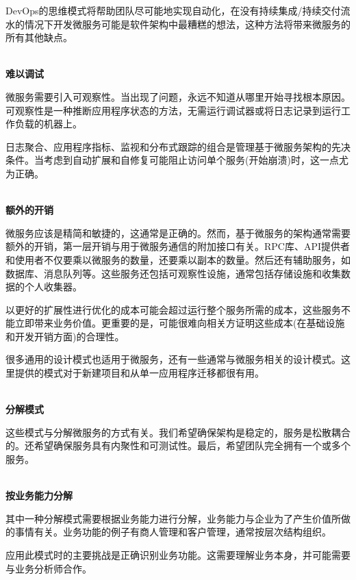 DevOps的思维模式将帮助团队尽可能地实现自动化，在没有持续集成/持续交付流水的情况下开发微服务可能是软件架构中最糟糕的想法，这种方法将带来微服务的所有其他缺点。

\hspace*{\fill} \\ %
\noindent
\textbf{难以调试}

微服务需要引入可观察性。当出现了问题，永远不知道从哪里开始寻找根本原因。可观察性是一种推断应用程序状态的方法，无需运行调试器或将日志记录到运行工作负载的机器上。

日志聚合、应用程序指标、监视和分布式跟踪的组合是管理基于微服务架构的先决条件。当考虑到自动扩展和自修复可能阻止访问单个服务(开始崩溃)时，这一点尤为正确。

\hspace*{\fill} \\ %
\noindent
\textbf{额外的开销}

微服务应该是精简和敏捷的，这通常是正确的。然而，基于微服务的架构通常需要额外的开销，第一层开销与用于微服务通信的附加接口有关。RPC库、API提供者和使用者不仅要乘以微服务的数量，还要乘以副本的数量。然后还有辅助服务，如数据库、消息队列等。这些服务还包括可观察性设施，通常包括存储设施和收集数据的个人收集器。

以更好的扩展性进行优化的成本可能会超过运行整个服务所需的成本，这些服务不能立即带来业务价值。更重要的是，可能很难向相关方证明这些成本(在基础设施和开发开销方面)的合理性。


很多通用的设计模式也适用于微服务，还有一些通常与微服务相关的设计模式。这里提供的模式对于新建项目和从单一应用程序迁移都很有用。

\hspace*{\fill} \\ %
\noindent
\textbf{分解模式}

这些模式与分解微服务的方式有关。我们希望确保架构是稳定的，服务是松散耦合的。还希望确保服务具有内聚性和可测试性。最后，希望团队完全拥有一个或多个服务。

\hspace*{\fill} \\ %
\noindent
\textbf{按业务能力分解}

其中一种分解模式需要根据业务能力进行分解，业务能力与企业为了产生价值所做的事情有关。业务功能的例子有商人管理和客户管理，通常按层次结构组织。

应用此模式时的主要挑战是正确识别业务功能。这需要理解业务本身，并可能需要与业务分析师合作。

